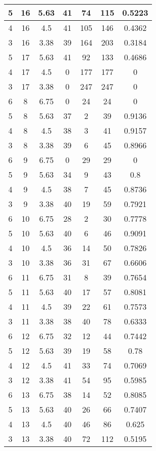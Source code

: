 \documentclass[letterpaper, 12pt]{article}
\begin{document}
\begin{longtable}{|c|c|c|c|c|c|c|}
\hline
5 & 16 & 5.63 & 41 & 74 & 115 & 0.5223 \\
\hline
4 & 16 & 4.5 & 41 & 105 & 146 & 0.4362 \\
\hline
3 & 16 & 3.38 & 39 & 164 & 203 & 0.3184 \\
\hline
5 & 17 & 5.63 & 41 & 92 & 133 & 0.4686 \\
\hline
4 & 17 & 4.5 & 0 & 177 & 177 & 0 \\
\hline
3 & 17 & 3.38 & 0 & 247 & 247 & 0 \\
\hline
6 & 8 & 6.75 & 0 & 24 & 24 & 0 \\
\hline
5 & 8 & 5.63 & 37 & 2 & 39 & 0.9136 \\
\hline
4 & 8 & 4.5 & 38 & 3 & 41 & 0.9157 \\
\hline
3 & 8 & 3.38 & 39 & 6 & 45 & 0.8966 \\
\hline
6 & 9 & 6.75 & 0 & 29 & 29 & 0 \\
\hline
5 & 9 & 5.63 & 34 & 9 & 43 & 0.8 \\
\hline
4 & 9 & 4.5 & 38 & 7 & 45 & 0.8736 \\
\hline
3 & 9 & 3.38 & 40 & 19 & 59 & 0.7921 \\
\hline
6 & 10 & 6.75 & 28 & 2 & 30 & 0.7778 \\
\hline
5 & 10 & 5.63 & 40 & 6 & 46 & 0.9091 \\
\hline
4 & 10 & 4.5 & 36 & 14 & 50 & 0.7826 \\
\hline
3 & 10 & 3.38 & 36 & 31 & 67 & 0.6606 \\
\hline
6 & 11 & 6.75 & 31 & 8 & 39 & 0.7654 \\
\hline
5 & 11 & 5.63 & 40 & 17 & 57 & 0.8081 \\
\hline
4 & 11 & 4.5 & 39 & 22 & 61 & 0.7573 \\
\hline
3 & 11 & 3.38 & 38 & 40 & 78 & 0.6333 \\
\hline
6 & 12 & 6.75 & 32 & 12 & 44 & 0.7442 \\
\hline
5 & 12 & 5.63 & 39 & 19 & 58 & 0.78 \\
\hline
4 & 12 & 4.5 & 41 & 33 & 74 & 0.7069 \\
\hline
3 & 12 & 3.38 & 41 & 54 & 95 & 0.5985 \\
\hline
6 & 13 & 6.75 & 38 & 14 & 52 & 0.8085 \\
\hline
5 & 13 & 5.63 & 40 & 26 & 66 & 0.7407 \\
\hline
4 & 13 & 4.5 & 40 & 46 & 86 & 0.625 \\
\hline
3 & 13 & 3.38 & 40 & 72 & 112 & 0.5195 \\
\hline

\end{longtable}
\end{document}
